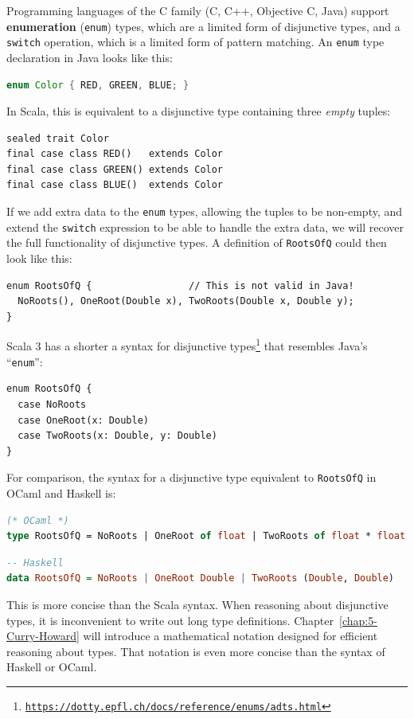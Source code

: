Programming languages of the C family (C, C++, Objective C, Java)
support \textbf{enumeration} (\lstinline!enum!) types,
which are a limited form of disjunctive types, and a \lstinline!switch!
operation, which is a limited form of pattern matching. An \lstinline!enum!
type declaration in Java looks like this:
\begin{lstlisting}[language=Java]
enum Color { RED, GREEN, BLUE; } 
\end{lstlisting}
In Scala, this is equivalent to a disjunctive type containing three
\emph{empty} tuples:
\begin{lstlisting}
sealed trait Color
final case class RED()   extends Color
final case class GREEN() extends Color
final case class BLUE()  extends Color
\end{lstlisting}
If we add extra data to the \lstinline!enum! types, allowing the
tuples to be non-empty, and extend the \lstinline!switch! expression
to be able to handle the extra data, we will recover the full functionality
of disjunctive types. A definition of \lstinline!RootsOfQ! could
then look like this: 
\begin{lstlisting}
enum RootsOfQ {                 // This is not valid in Java!
  NoRoots(), OneRoot(Double x), TwoRoots(Double x, Double y);
}
\end{lstlisting}
Scala 3 has a shorter a syntax for disjunctive types\footnote{\texttt{\href{https://dotty.epfl.ch/docs/reference/enums/adts.html}{https://dotty.epfl.ch/docs/reference/enums/adts.html}}}
that resembles Java\textsf{'}s \textsf{``}\lstinline!enum!\textsf{''}:
\begin{lstlisting}
enum RootsOfQ {
  case NoRoots
  case OneRoot(x: Double)
  case TwoRoots(x: Double, y: Double)
}
\end{lstlisting}
For comparison, the syntax for a disjunctive type equivalent to \lstinline!RootsOfQ!
in OCaml and Haskell is:
\begin{lstlisting}[language=Caml]
(* OCaml *)
type RootsOfQ = NoRoots | OneRoot of float | TwoRoots of float * float
\end{lstlisting}
\begin{lstlisting}[language=Haskell]
-- Haskell
data RootsOfQ = NoRoots | OneRoot Double | TwoRoots (Double, Double)
\end{lstlisting}
This is more concise than the Scala syntax. When reasoning about disjunctive
types, it is inconvenient to write out long type definitions. Chapter~\ref{chap:5-Curry-Howard}
will introduce a mathematical notation designed for efficient reasoning
about types. That notation is even more concise than the syntax of
Haskell or OCaml.

